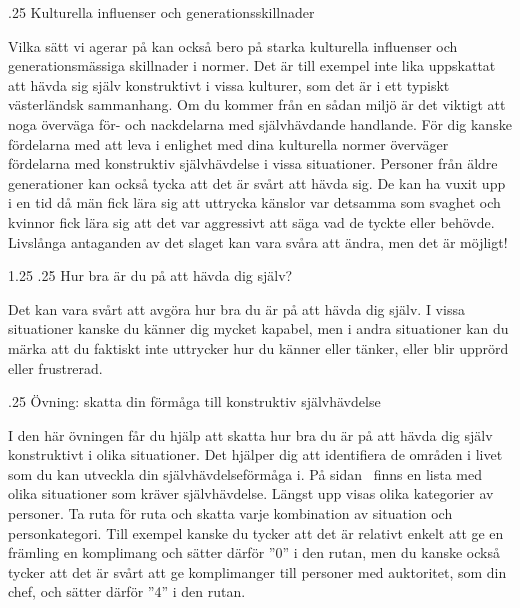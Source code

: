\documentclass[swedish,a4paper]{book}
\makeatletter
\renewcommand\section{\@startsection{section}{1}{\z@}%
                                   {1.25\baselineskip}%
                                   {.25\baselineskip}%
                                   {\fontsize{1.25\baselineskip}{1.25\baselineskip}\selectfont\sffamily\bfseries}} %
\renewcommand\subsection{\@startsection{subsection}{1}{\z@}%
                                   {\baselineskip}%
                                   {.25\baselineskip}%
                                   {\fontsize{1\baselineskip}{1.25\baselineskip}\selectfont\sffamily\bfseries}} %
\makeatother
\begin{document}
\subsection{Kulturella influenser och
generationsskillnader}\label{kulturella-influenser-och-generationsskillnader}

Vilka sätt vi agerar på kan också bero på starka kulturella influenser
och generationsmässiga skillnader i normer. Det är till exempel inte
lika uppskattat att hävda sig själv konstruktivt i vissa kulturer, som
det är i ett typiskt västerländsk sammanhang. Om du kommer från en sådan
miljö är det viktigt att noga överväga för- och nackdelarna med
självhävdande handlande. För dig kanske fördelarna med att leva i enlighet med dina kulturella normer överväger
fördelarna med konstruktiv självhävdelse i vissa situationer. Personer från äldre
generationer kan också tycka att det är svårt att hävda sig. De kan ha
vuxit upp i en tid då män fick lära sig att uttrycka känslor var detsamma som svaghet och kvinnor fick lära sig att det var aggressivt att
säga vad de tyckte eller behövde. Livslånga antaganden av det slaget kan
vara svåra att ändra, men det är möjligt!

\section{Hur bra är du på att hävda dig själv?}\label{hur-bra-uxe4r-du-puxe5-att-huxe4vda-dig-sjuxe4lv}

Det kan vara svårt att avgöra hur bra du är på att hävda dig själv. I
vissa situationer kanske du känner dig mycket kapabel, men i andra
situationer kan du märka att du faktiskt inte uttrycker hur du känner
eller tänker, eller blir upprörd eller frustrerad.

\subsection{Övning: skatta din förmåga till konstruktiv självhävdelse}\label{skatta}

I den här övningen får du hjälp att skatta hur bra du är på att hävda dig
själv konstruktivt i olika situationer. Det hjälper dig att identifiera de områden i livet som du kan utveckla din självhävdelseförmåga i. På sidan~\pageref{exercise1} finns en lista med olika situationer som kräver självhävdelse. Längst upp visas olika kategorier av
personer. Ta ruta för ruta och skatta varje kombination av situation och
personkategori. Till exempel kanske du tycker att det är relativt enkelt
att ge en främling en komplimang och sätter därför ''0'' i den rutan,
men du kanske också tycker att det är svårt att ge komplimanger till
personer med auktoritet, som din chef, och sätter därför ''4'' i den
rutan.
\end{document}
